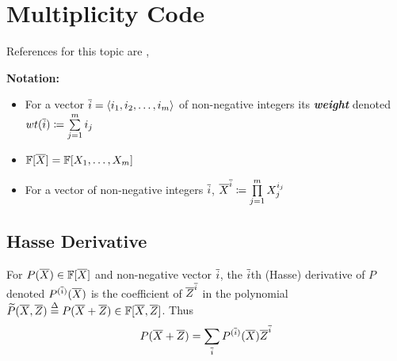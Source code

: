 \chapter{Multiplicity Code}
References for this topic are \cite{highratesublin}, \cite{kopparty2015remarks}
\parinf

\textbf{Notation:}  \begin{itemize}
	\item For a vector $\overline{i}=\langle i_1,i_2,\dots, i_m\rangle$ of non-negative integers its \textbf{\textit{weight}} denoted $wt(\overline{i})\coloneqq \sum\limits_{j=1}^m i_j$
	\item $\mathbb{F}[\overline{X}]=\mathbb{F}[X_1,\dots, X_m]$
	\item For a vector of non-negative integers $\overline{i}$, $\overline{X}^{\overline{i}}\coloneqq \prod\limits_{j=1}^mX_j^{i_j}$
\end{itemize}\parinn 
\section{Hasse Derivative}
\begin{definition}
	For $P(\overline{X})\in \mathbb{F}[\overline{X}]$ and non-negative vector $\overline{i}$, the $\overline{i}$th (Hasse) derivative of $P$ denoted $P^{(\overline{i})}(\overline{X})$ is the coefficient of $\overline{Z}^{\overline{i}}$ in the polynomial $\widetilde{P} (\overline{X},\overline{Z})\overset{\Delta}{=} P(\overline{X}+\overline{Z}) \in \mathbb{F}[\overline{X},\overline{Z}]$. Thus $$P(\overline{X}+\overline{Z})= \sum_{\overline{i}} P^{(\overline{i})}(\overline{X})\overline{Z}^{ \overline{i}}$$
\end{definition}
